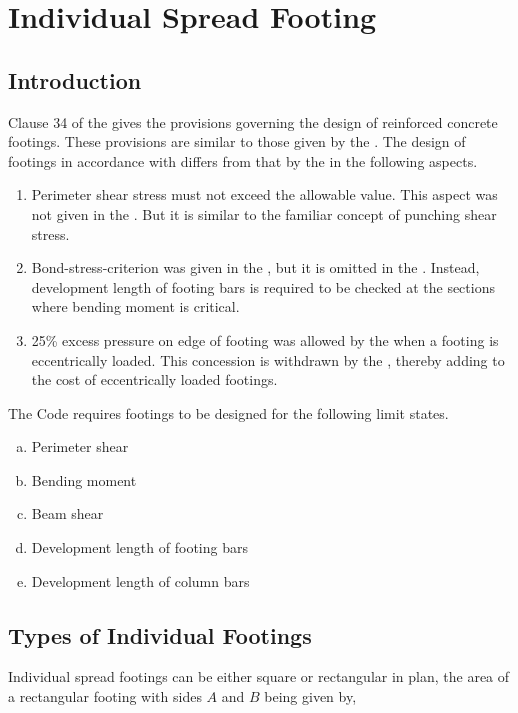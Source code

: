 \chapter{Individual Spread Footing}
\section{Introduction} Clause 34 of the   gives the
provisions governing the design of reinforced concrete footings.  These
provisions are similar to those given by the \citeauthor{aci1981aci}. 
The design of footings in accordance with  differs
from that by the  in the following aspects.

\begin{enumerate}[I]
\item Perimeter shear stress must not exceed the allowable value. This
aspect was not given in the . But it is similar to
the familiar concept of punching shear stress.

\item Bond-stress-criterion was given in the , but it
is omitted in the . Instead, development length of
footing bars is required to be checked at the sections where bending
moment is critical.

\item 25\% excess pressure on edge of footing was allowed by the 
 when a footing is eccentrically loaded. This 
concession is withdrawn by the , thereby adding to 
the cost of eccentrically loaded footings.
\end{enumerate}
The Code requires footings to be designed for the following limit states.

\begin{enumerate}[(a)]
\item Perimeter shear
\item Bending moment
\item Beam shear
\item Development length of footing bars
\item Development length of column bars
\end{enumerate}

\section{Types of Individual Footings} Individual spread footings can be
either square or rectangular in plan, the area of a rectangular footing
with sides $A$ and $B$ being given by,

